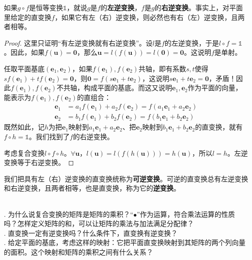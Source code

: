 \documentclass[12pt,UTF8]{ctexbook}
\begin{document}
如果$g\circ f$是恒等变换$\mathds{1}$，就说$g$是$f$的\textbf{左逆变换}，$f$是$g$的\textbf{右逆变换}。事实上，对平面里给定的直变换$f$，如果它有左（右）逆变换，则必然也有右（左）逆变换，且两者相等。

\begin{proof}
    这里只证明“有左逆变换就有右逆变换”。设$l$是$f$的左逆变换，于是$l\circ f = \mathds{1}$。因此，如果$f(\mathbf{u}) = \mathbf{0}$，那么$\mathbf{u} = l(f(\mathbf{u})) = l(\mathbf{0}) = \mathbf{0}$。这说明$f$是单射。
    
    任取平面基底$(\mathbf{e}_1,\mathbf{e}_2)$，如果$f(\mathbf{e}_1),f(\mathbf{e}_2)$共轴，即有系数$s,t$使得$sf(\mathbf{e}_1)+tf(\mathbf{e}_2)=\mathbf{0}$，则$\mathbf{0} = f(s\mathbf{e}_1+t\mathbf{e}_2)$，这说明$s\mathbf{e}_1+t\mathbf{e}_2 = \mathbf{0}$，矛盾！因此$f(\mathbf{e}_1),f(\mathbf{e}_2)$不共轴，构成平面的基底。而这又说明$\mathbf{e}_1,\mathbf{e}_2$作为平面的向量，能表示为$f(\mathbf{e}_1),f(\mathbf{e}_2)$的直组合：
    \begin{align*}
        \mathbf{e}_1 & = a_1f(\mathbf{e}_1) + a_2f(\mathbf{e}_2) = f(a_1\mathbf{e}_1+a_2\mathbf{e}_2)\\ 
        \mathbf{e}_2 & = b_1f(\mathbf{e}_1) + b_2f(\mathbf{e}_2) = f(b_1\mathbf{e}_1+b_2\mathbf{e}_2)
    \end{align*}
    既然如此，记$h$为把$\mathbf{e}_1$映射到$a_1\mathbf{e}_1+a_2\mathbf{e}_2$、把$\mathbf{e}_2$映射到$b_1\mathbf{e}_1+b_2\mathbf{e}_2$的直变换，就有$f\circ h = \mathds{1}$。我们找到了$f$的右逆变换。

    考虑复合变换$l\circ f\circ h$。$\forall \mathbf{u}$，$l(\mathbf{u}) = l(f(h(\mathbf{u}))) = h(\mathbf{u})$，所以$l = h$。左逆变换等于右逆变换。
\end{proof}

我们把具有左（右）逆变换的直变换统称为\textbf{可逆变换}。可逆的直变换总有左逆变换和右逆变换，且两者相等，也是直变换，称为它的\textbf{逆变换}。

\begin{sk}
    \mbox{} \\
    . 为什么说复合变换的矩阵是矩阵的乘积？“$\bullet$”作为运算，符合乘法运算的性质吗？怎样定义矩阵的和，可以让矩阵的乘法与加法满足分配律？\\
    . 直变换一定有逆变换吗？什么条件下，直变换有逆变换？\\
    . 给定平面的基底，考虑这样的映射：它把平面直变换映射到其矩阵的两个列向量的面积。这个映射和矩阵的乘积之间有什么关系？
\end{sk}
\end{document}
